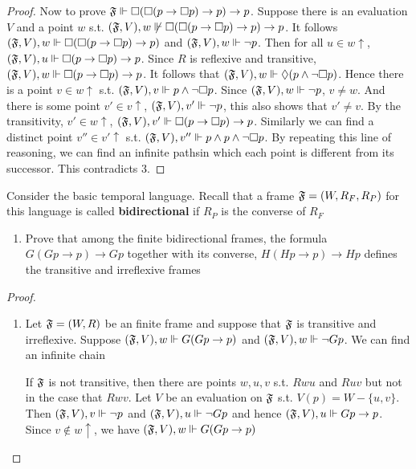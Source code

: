 \documentclass[11pt]{article}
\begin{document}
\begin{proof}
Now to prove \(\mathfrak{F}\Vdash\Box(\Box(p\to\Box p)\to p)\to p\). Suppose there is
an evaluation \(V\) and a point \(w\) s.t.
\((\mathfrak{F},V),w\not\Vdash\Box(\Box(p\to\Box p)\to p)\to p\). It follows
\((\mathfrak{F},V),w\Vdash\Box(\Box(p\to\Box p)\to p)\) and \((\mathfrak{F},V),w\Vdash\neg
   p\).
Then for all \(u\in w\uparrow\), \((\mathfrak{F},V),u\Vdash\Box(p\to\Box p)\to p\).
Since \(R\) is reflexive and transitive, \((\mathfrak{F},V),w\Vdash\Box(p\to\Box p)\to
   p\). It follows that
\((\mathfrak{F},V),w\Vdash\Diamond(p\wedge\neg\Box p)\). Hence there is a point \(v\in
   w\uparrow\) s.t. \((\mathfrak{F},V),v\Vdash p\wedge\neg\Box p\). Since
\((\mathfrak{F},V),w\Vdash\neg p\), \(v\neq w\). And there is some point \(v'\in
   v\uparrow\), \((\mathfrak{F},V),v'\Vdash\neg p\), this also shows that \(v'\neq v\).
By the transitivity, \(v'\in w\uparrow\), \((\mathfrak{F},V),v'\Vdash\Box(p\to\Box
   p)\to p\). Similarly we can find a distinct point \(v''\in v'\uparrow\) s.t.
\((\mathfrak{F},V),v''\Vdash p\wedge p\wedge\neg\Box p\). By repeating this line of
reasoning, we can find an infinite pathsin which each point is different from
its successor. This contradicts 3.
\end{proof}

\begin{exercise}
\label{ex3.2.3}
Consider the basic temporal language. Recall that a frame \(\mathfrak{F}=(W,R_F,R_P)\)
for this language is called \textbf{bidirectional} if \(R_P\) is the converse of
\(R_F\)
\begin{enumerate}
\item Prove that among the finite bidirectional frames, the formula \(G(Gp\to
      p)\to Gp\) together with its converse, \(H(Hp\to p)\to Hp\) defines the
transitive and irreflexive frames
\end{enumerate}
\end{exercise}

\begin{proof}
\begin{enumerate}
\item Let \(\mathfrak{F}=(W,R)\) be an finite frame and suppose that \(\mathfrak{F}\) is
transitive and irreflexive. Suppose \((\mathfrak{F},V),w\Vdash G(Gp\to p)\) and
\((\mathfrak{F},V),w\Vdash\neg Gp\). We can find an infinite chain

If \(\mathfrak{F}\) is not transitive, then there are points \(w,u,v\) s.t. \(Rwu\)
and \(Ruv\) but not in the case that \(Rwv\). Let \(V\) be an evaluation
on \(\mathfrak{F}\) s.t. \(V(p)=W-\{u,v\}\). Then \((\mathfrak{F},V),v\Vdash\neg p\) and
\((\mathfrak{F},V),u\Vdash\neg Gp\) and hence \((\mathfrak{F},V),u\Vdash Gp\to p\). Since
\(v\not\in w\uparrow\), we have \((\mathfrak{F},V),w\Vdash G(Gp\to p)\)
\end{enumerate}
\end{proof}
\end{document}
